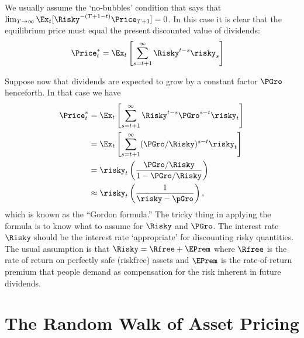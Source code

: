 \documentclass{handout}
\begin{document}
We usually assume the `no-bubbles' condition that says that $\lim_{T 
\rightarrow \infty} \Ex_{t}[\Risky^{-(T+1-t)}\Price_{T+1}] = 0$.  In this case it is clear
that the equilibrium price must equal the present discounted value 
of dividends: 
\begin{equation}\begin{gathered}\begin{aligned}
        \Price_{t}^{*} & =  \Ex_{t}\left[\sum_{s=t+1}^{\infty} \Risky^{t-s}\risky_{s}\right]
\end{aligned}\end{gathered}\end{equation}

Suppose now that dividends are expected to grow by a constant factor $\PGro$ 
henceforth.  In that case we have
\begin{equation}\begin{gathered}\begin{aligned}
        \Price_{t}^{*} & =  \Ex_{t}\left[\sum_{s=t+1}^{\infty} \Risky^{t-s}\PGro^{s-t}\risky_{t}\right]
\\ & =  \Ex_{t} \left[\sum_{s=t+1}^{\infty} (\PGro/\Risky )^{s-t}\risky_{t}\right]
\\ & =  \risky_{t} \left(\frac{\PGro/\Risky}{1-\PGro/\Risky }\right)
\\ & \approx  \risky_{t} \left(\frac{1}{\risky-\pGro}\right)
,
\end{aligned}\end{gathered}\end{equation}
which is known as the ``Gordon formula.''  The tricky thing in applying 
the formula is to know what to assume for $\Risky$ and $\PGro$.  The interest 
rate $\Risky$ should be the interest rate `appropriate' for discounting 
risky quantities.  The usual assumption is that $\Risky = \Rfree+\EPrem$ 
where $\Rfree$ is the rate of return on perfectly safe (riskfree) 
assets and $\EPrem$ is the rate-of-return premium that people demand as 
compensation for the risk inherent in future dividends.

\section{The Random Walk of Asset Pricing}
\end{document}
